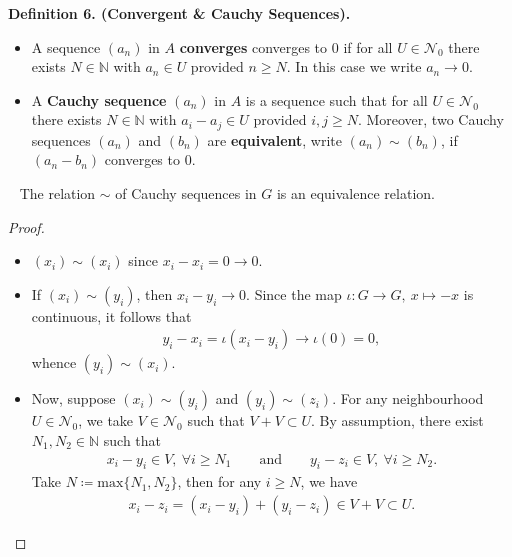 \documentclass[12pt,a4paper,footinclude=true,headinclude=true]{scrbook} %
\newenvironment{lemma}[2][]
{\renewcommand\theinnercustomlemma{#2}\innercustomlemma[#1]
\begin{mdframed}[backgroundcolor=gray!20]\ }
{\end{mdframed}\endinnercustomprop}
\newenvironment{definition}[2][Definition]
    { \begin{mdframed}[backgroundcolor=gray!20] \textbf{#1 #2.}\ }
    {  \end{mdframed}}
\begin{document}
\begin{definition}{6. (Convergent \& Cauchy Sequences)}
    \begin{itemize}
        \item A sequence $(a_n)$ in $A$ \textbf{converges} converges to $0$ if for all $U\in\mathcal{N}_0$ there exists $N\in\mathbb{N}$ with $a_n\in U$ provided $n\geq N$. In this case we write $a_n\longrightarrow0$.
        \item A \textbf{Cauchy sequence} $(a_n)$ in $A$ is a sequence such that for all $U\in\mathcal{N}_0$ there exists $N\in\mathbb{N}$ with $a_i-a_j\in U$ provided $i,j\geq N$. Moreover, two Cauchy sequences $(a_n)$ and $(b_n)$ are \textbf{equivalent}, write $(a_n)\sim(b_n)$, if $(a_n-b_n)$ converges to $0$. 
    \end{itemize}
\end{definition}
\newpage
\begin{lemma}{7}
    The relation $\sim$ of Cauchy sequences in $G$ is an equivalence relation.
\end{lemma}
\begin{proof}
    \begin{itemize}
        \item $(x_i)\sim(x_i)$ since $x_i-x_i=0\longrightarrow0$.
        \item If $(x_i)\sim(y_i)$, then $x_i-y_i\longrightarrow0$. Since the map $\iota:G\to G,\ x\mapsto-x$ is continuous, it follows that 
        \begin{align*}
            y_i-x_i=\iota(x_i-y_i)\longrightarrow\iota(0)=0,
        \end{align*}
        whence $(y_i)\sim(x_i)$.
        \item Now, suppose $(x_i)\sim(y_i)$ and $(y_i)\sim(z_i)$. For any neighbourhood $U\in\mathcal{N}_0$, we take $V\in\mathcal{N}_0$ such that $V+V\subset U$. By assumption, there exist $N_1,N_2\in\mathbb{N}$ such that 
        \begin{align*}
            x_i-y_i\in V,\ \forall i\geq N_1\qquad \text{and}\qquad y_i-z_i\in V,\ \forall i\geq N_2.
        \end{align*}
        Take $N\coloneqq\mathrm{max}\{N_1,N_2\}$, then for any $i\geq N$, we have
        \begin{align*}
            x_i-z_i=(x_i-y_i)+(y_i-z_i)\in V+V\subset U.
        \end{align*}
    \end{itemize}
\end{proof}
\end{document}
